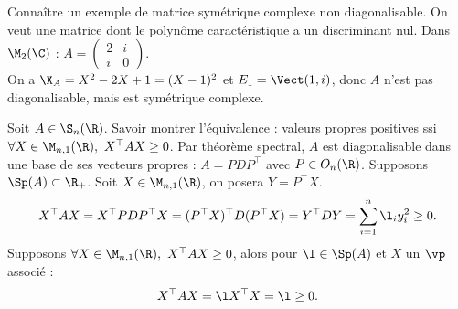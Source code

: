 \documentclass[french, 11pt]{article}
\begin{document}
\begin{question}{}{}
    Connaître un exemple de matrice symétrique complexe non diagonalisable.
    \tcblower
    On veut une matrice dont le polynôme caractéristique a un discriminant nul. Dans $\M_2(\C)$ : $A=\begin{pmatrix}2 & i \\ i & 0\end{pmatrix}$.\\
    On a $\X_A=X^2-2X+1=(X-1)^2$ et $E_1 = \Vect(1, i)$, donc $A$ n'est pas diagonalisable, mais est symétrique complexe. 
\end{question}

\begin{question}{}{}
    Soit $A\in\S_n(\R)$. Savoir montrer l'équivalence : valeurs propres positives ssi $\forall X \in \M_{n,1}(\R), ~ X^\top AX \geq 0$.
    \tcblower
    Par théorème spectral, $A$ est diagonalisable dans une base de ses vecteurs propres : $A=PDP^\top$ avec $P\in O_n(\R)$. 
    \boxed{\ra} Supposons $\Sp(A)\subset \R_+$. Soit $X\in\M_{n,1}(\R)$, on posera $Y=P^\top X$.
    \begin{equation*}
        X^\top AX = X^\top PDP^\top X = (P^\top X)^\top D (P^\top X) = Y^\top DY = \sum_{i=1}^n \l_i y_i^2 \geq 0. 
    \end{equation*}
    \boxed{\la} Supposons $\forall X \in \M_{n,1}(\R), ~ X^\top AX \geq 0$, alors pour $\l\in\Sp(A)$ et $X$ un $\vp$ associé :
    \begin{equation*}
        X^\top AX = \l X^\top X = \l \geq 0.
    \end{equation*}
\end{question}

\pagebreak
\end{document}
